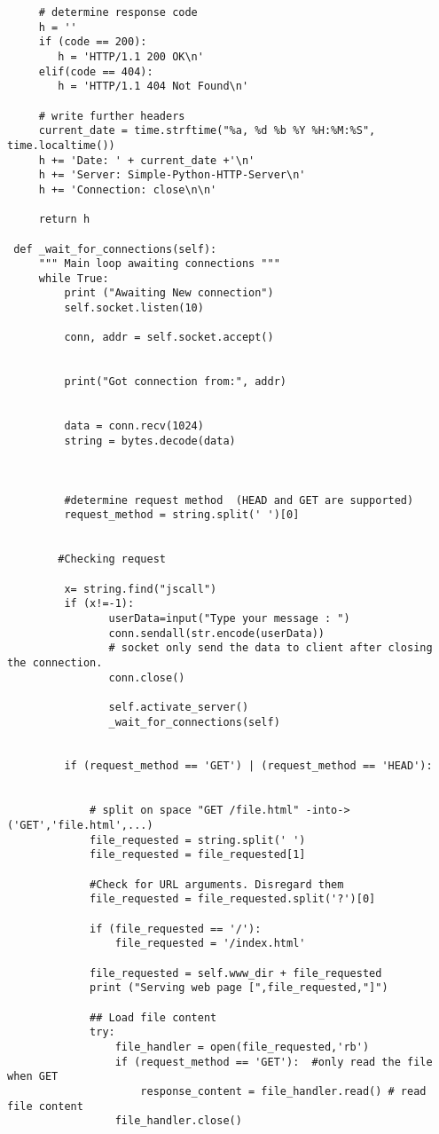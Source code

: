 \documentclass{WeSTassignment}
\begin{document}
\begin{lstlisting}
     # determine response code
     h = ''
     if (code == 200):
        h = 'HTTP/1.1 200 OK\n'
     elif(code == 404):
        h = 'HTTP/1.1 404 Not Found\n'

     # write further headers
     current_date = time.strftime("%a, %d %b %Y %H:%M:%S", time.localtime())
     h += 'Date: ' + current_date +'\n'
     h += 'Server: Simple-Python-HTTP-Server\n'
     h += 'Connection: close\n\n'

     return h

 def _wait_for_connections(self):
     """ Main loop awaiting connections """
     while True:
         print ("Awaiting New connection")
         self.socket.listen(10)

         conn, addr = self.socket.accept()


         print("Got connection from:", addr)


         data = conn.recv(1024)
         string = bytes.decode(data)



         #determine request method  (HEAD and GET are supported)
         request_method = string.split(' ')[0]


        #Checking request

         x= string.find("jscall")
         if (x!=-1):
                userData=input("Type your message : ")
                conn.sendall(str.encode(userData))
                # socket only send the data to client after closing the connection.
                conn.close()

                self.activate_server()
                _wait_for_connections(self)

    
         if (request_method == 'GET') | (request_method == 'HEAD'):


             # split on space "GET /file.html" -into-> ('GET','file.html',...)
             file_requested = string.split(' ')
             file_requested = file_requested[1]

             #Check for URL arguments. Disregard them
             file_requested = file_requested.split('?')[0]

             if (file_requested == '/'):
                 file_requested = '/index.html'

             file_requested = self.www_dir + file_requested
             print ("Serving web page [",file_requested,"]")

             ## Load file content
             try:
                 file_handler = open(file_requested,'rb')
                 if (request_method == 'GET'):  #only read the file when GET
                     response_content = file_handler.read() # read file content
                 file_handler.close()


\end{lstlisting}
\end{document}

